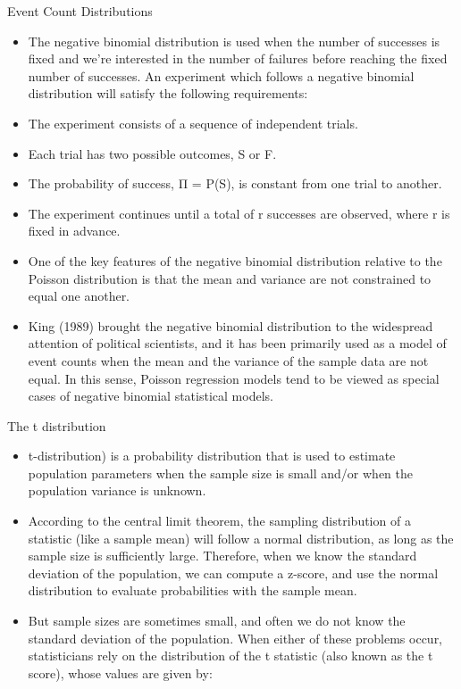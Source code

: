 \documentclass[
  ignorenonframetext,
]{beamer}
\begin{document}
\begin{frame}{Event Count Distributions}
\protect\hypertarget{event-count-distributions-2}{}

\begin{itemize}
\item
  The negative binomial distribution is used when the number of
  successes is fixed and we're interested in the number of failures
  before reaching the fixed number of successes. An experiment which
  follows a negative binomial distribution will satisfy the following
  requirements:
\item
  The experiment consists of a sequence of independent trials.
\item
  Each trial has two possible outcomes, S or F.
\item
  The probability of success, Π = P(S), is constant from one trial to
  another.
\item
  The experiment continues until a total of r successes are observed,
  where r is fixed in advance.
\item
  One of the key features of the negative binomial distribution relative
  to the Poisson distribution is that the mean and variance are not
  constrained to equal one another.
\item
  King (1989) brought the negative binomial distribution to the
  widespread attention of political scientists, and it has been
  primarily used as a model of event counts when the mean and the
  variance of the sample data are not equal. In this sense, Poisson
  regression models tend to be viewed as special cases of negative
  binomial statistical models.
\end{itemize}

\end{frame}

\begin{frame}{The t distribution}
\protect\hypertarget{the-t-distribution}{}

\begin{itemize}
\item
  t-distribution) is a probability distribution that is used to estimate
  population parameters when the sample size is small and/or when the
  population variance is unknown.
\item
  According to the central limit theorem, the sampling distribution of a
  statistic (like a sample mean) will follow a normal distribution, as
  long as the sample size is sufficiently large. Therefore, when we know
  the standard deviation of the population, we can compute a z-score,
  and use the normal distribution to evaluate probabilities with the
  sample mean.
\item
  But sample sizes are sometimes small, and often we do not know the
  standard deviation of the population. When either of these problems
  occur, statisticians rely on the distribution of the t statistic (also
  known as the t score), whose values are given by:
\end{itemize}

\end{frame}
\end{document}
